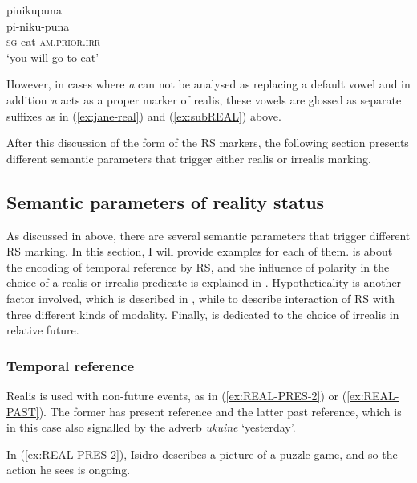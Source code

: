 \ea\label{ex:real-irr-no-clash}
\begingl 
\glpreamble pinikupuna\\
\gla pi-niku-puna\\ 
\textsc{sg}-eat-\textsc{am.prior}.\textsc{irr}\\ 
\glft ‘you will go to eat’
\xe

However, in cases where \textit{a} can not be analysed as replacing a default vowel and in addition \textit{u} acts as a proper marker of realis, these vowels are glossed as separate suffixes as in (\ref{ex:jane-real}) and (\ref{ex:subREAL}) above.

After this discussion of the form of the RS markers, the following section presents different semantic parameters that trigger either realis or irrealis marking.

\subsection{Semantic parameters of reality status}\label{RS:parameters}

As discussed in  above, there are several semantic parameters that trigger different RS marking. In this section, I will provide examples for each of them.  is about the encoding of temporal reference by RS, and the influence of polarity in the choice of a realis or irrealis predicate is explained in . Hypotheticality is another factor involved, which is described in , while  to  describe interaction of RS with three different kinds of modality. Finally,  is dedicated to the choice of irrealis in relative future.

\subsubsection{Temporal reference}\label{sec:RS_TemporalReference}

Realis is used with non-future events, as in (\ref{ex:REAL-PRES-2}) or (\ref{ex:REAL-PAST}). The former has present reference and the latter past reference, which is in this case also signalled by the adverb \textit{ukuine} ‘yesterday’.

In (\ref{ex:REAL-PRES-2}), Isidro describes a picture of a puzzle game, and so the action he sees is ongoing.

